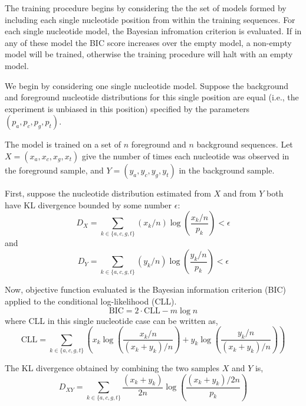 \documentclass[letterpaper]{article}
\begin{document}
The training procedure begins by considering the the set of models formed by
including each single nucleotide position from within the training sequences.
For each single nucleotide model, the Bayesian infromation criterion is
evaluated. If in any of these model the BIC score increases over the empty
model, a non-empty model will be trained, otherwise the training procedure will
halt with an empty model.

We begin by considering one single nucleotide model. Suppose the background and
foreground nucleotide distributions for this single position are equal (i.e.,
the experiment is unbiased in this position) specified by the parameters $(p_{a}, p_{c},
p_{g}, p_{t})$.

The model is trained on a set of $n$ foreground and $n$ background sequences.
Let $X = (x_{a}, x_{c}, x_{g}, x_{t})$ give the number of times each nucleotide
was observed in the foreground sample, and $Y = (y_{a}, y_{c}, y_{g}, y_{t})$
in the background sample.

First, suppose the nucleotide distribution estimated from $X$ and from $Y$ both
have KL divergence bounded by some number $\epsilon$:
$$ D_{X} = \sum_{k \in \{a, c, g, t\}} (x_k / n) \log \left( \frac{x_k / n}{p_k}
\right) < \epsilon $$
and
$$ D_{Y} = \sum_{k \in \{a, c, g, t\}} (y_k / n) \log \left( \frac{y_k / n}{p_k}
\right) < \epsilon $$

Now, objective function evaluated is the Bayesian information criterion (BIC)
applied to the conditional log-likelihood (CLL).
$$ \text{BIC} = 2 \cdot \text{CLL} - m \log n $$
where CLL in this single nucleotide case can be written as,
$$ \text{CLL} =
\sum_{k \in \{a, c, g, t\}}
\left(
x_k \log \left( \frac{x_k/n}{(x_k + y_k)/n} \right) +
y_k \log \left( \frac{y_k/n}{(x_k + y_k)/n} \right) \right)$$

The KL divergence obtained by combining the two samples $X$ and $Y$ is,
$$D_{XY} = \sum_{k \in \{a, c, g, t\}}
\frac{(x_k + y_k)}{2n}
\log \left( \frac{(x_k + y_k)/2n}{p_k} \right)$$
\end{document}
